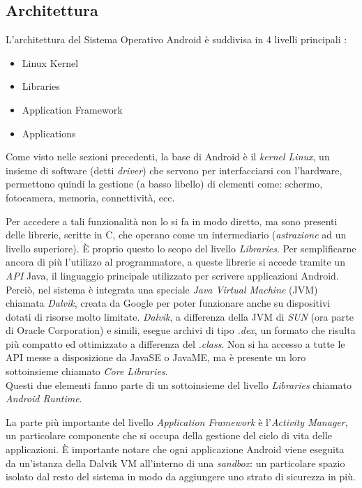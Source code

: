\subsection{Architettura}
L'architettura del Sistema Operativo Android è suddivisa in 4 livelli principali \cite{androiden}: 
\begin{itemize}
    \item Linux Kernel
    \item Libraries
    \item Application Framework
    \item Applications
\end{itemize}

Come visto nelle sezioni precedenti, la base di Android è il \textit{kernel Linux}, un insieme di software (detti \textit{driver}) che servono per interfacciarsi con l'hardware, permettono quindi la gestione (a basso libello) di elementi come: schermo, fotocamera, memoria, connettività, ecc. 

Per accedere a tali funzionalità non lo si fa in modo diretto, ma sono presenti delle librerie, scritte in C, che operano come un intermediario (\textit{astrazione} ad un livello superiore). È proprio questo lo scopo del livello \textit{Libraries}. Per semplificarne ancora di più l'utilizzo al programmatore, a queste librerie si accede tramite un \textit{API} Java, il linguaggio principale utilizzato per scrivere applicazioni Android. Perciò, nel sistema è integrata una speciale \textit{Java Virtual Machine} (JVM) chiamata \textit{Dalvik}, creata da Google per poter funzionare anche su dispositivi dotati di risorse molto limitate. \textit{Dalvik}, a differenza della JVM di \textit{SUN} (ora parte di Oracle Corporation) e simili, esegue archivi di tipo \textit{.dex}, un formato che risulta più compatto ed ottimizzato a differenza del \textit{.class}. Non si ha accesso a tutte le API messe a disposizione da JavaSE o JavaME, ma è presente un loro sottoinsieme chiamato \textit{Core Libraries}.\\
Questi due elementi fanno parte di un sottoinsieme del livello \textit{Libraries} chiamato \textit{Android Runtime}.

La parte più importante del livello \textit{Application Framework} è l'\textit{Activity Manager}, un particolare componente che si occupa della gestione del ciclo di vita delle applicazioni. È importante notare che ogni applicazione Android viene eseguita da un'istanza della Dalvik VM all'interno di una \textit{sandbox}: un particolare spazio isolato dal resto del sistema in modo da aggiungere uno strato di sicurezza in più.

